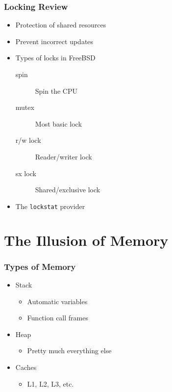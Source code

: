 \documentclass[pdftex]{beamer} %
\begin{document}
\begin{frame}[fragile]
  \frametitle{Locking Review}
  \begin{itemize}
  \item Protection of shared resources
  \item Prevent incorrect updates
  \item Types of locks in FreeBSD
  \begin{description}
  \item[spin] Spin the CPU
  \item[mutex] Most basic lock
  \item[r/w lock] Reader/writer lock
  \item[sx lock] Shared/exclusive lock
  \end{description}
  \item The \verb|lockstat| provider
  \end{itemize}
  
\end{frame}

\section{The Illusion of Memory}
\label{sec:memory}

\begin{frame}
  \frametitle{Types of Memory}
  \begin{itemize}
  \item Stack
    \begin{itemize}
    \item Automatic variables
    \item Function call frames
    \end{itemize}
\pause
  \item Heap
    \begin{itemize}
    \item Pretty much everything else
    \end{itemize}
  \item Caches
    \begin{itemize}
    \item L1, L2, L3, etc.
    \end{itemize}
  \end{itemize}
\end{frame}
\end{document}
